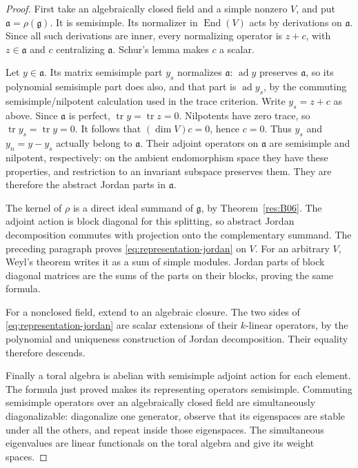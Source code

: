 \begin{proof}
First take an algebraically closed field and a
simple nonzero \(V\), and put
\(\mathfrak a=\rho(\mathfrak g)\).
It is semisimple. Its normalizer in
\(\operatorname{End}(V)\) acts by derivations on
\(\mathfrak a\). Since all such derivations are
inner, every normalizing operator is \(z+c\),
with \(z\in\mathfrak a\) and \(c\) centralizing
\(\mathfrak a\). Schur's lemma makes \(c\)
a scalar.

Let \(y\in\mathfrak a\). Its matrix semisimple
part \(y_s\) normalizes \(\mathfrak a\):
\(\operatorname{ad}y\) preserves \(\mathfrak a\),
so its polynomial semisimple part does also,
and that part is \(\operatorname{ad}y_s\), by
the commuting semisimple/nilpotent calculation
used in the trace criterion. Write \(y_s=z+c\)
as above. Since \(\mathfrak a\) is perfect,
\(\operatorname{tr}y=\operatorname{tr}z=0\).
Nilpotents have zero trace, so
\(\operatorname{tr}y_s=\operatorname{tr}y=0\).
It follows that \((\dim V)c=0\), hence \(c=0\).
Thus \(y_s\) and \(y_n=y-y_s\) actually belong
to \(\mathfrak a\). Their adjoint operators
on \(\mathfrak a\) are semisimple and nilpotent,
respectively: on the ambient endomorphism
space they have these properties, and
restriction to an invariant subspace preserves
them. They are therefore the abstract Jordan
parts in \(\mathfrak a\).

The kernel of \(\rho\) is a direct ideal
summand of \(\mathfrak g\), by
Theorem~\ref{res:B06}. The adjoint action is
block diagonal for this splitting, so abstract
Jordan decomposition commutes with projection
onto the complementary summand. The preceding
paragraph proves \eqref{eq:representation-jordan}
on \(V\).
For an arbitrary \(V\), Weyl's theorem writes
it as a sum of simple modules. Jordan parts
of block diagonal matrices are the sums of
the parts on their blocks, proving the same
formula.

For a nonclosed field, extend to an algebraic
closure. The two sides of
\eqref{eq:representation-jordan} are scalar
extensions of their \(k\)-linear operators,
by the polynomial and uniqueness construction
of Jordan decomposition. Their equality
therefore descends.

Finally a toral algebra is abelian with
semisimple adjoint action for each element.
The formula just proved makes its representing
operators semisimple. Commuting semisimple
operators over an algebraically closed field
are simultaneously diagonalizable: diagonalize
one generator, observe that its eigenspaces
are stable under all the others, and repeat
inside those eigenspaces. The simultaneous
eigenvalues are linear functionals on the
toral algebra and give its weight spaces.
\end{proof}
